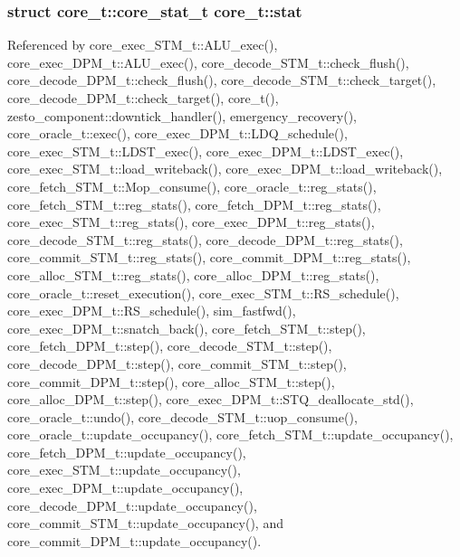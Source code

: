 \subsubsection[{stat}]{\setlength{\rightskip}{0pt plus 5cm}struct {\bf core\_\-t::core\_\-stat\_\-t}  {\bf core\_\-t::stat}}\label{classcore__t_fd66018e0e0529be576f673452a032df}




Referenced by core\_\-exec\_\-STM\_\-t::ALU\_\-exec(), core\_\-exec\_\-DPM\_\-t::ALU\_\-exec(), core\_\-decode\_\-STM\_\-t::check\_\-flush(), core\_\-decode\_\-DPM\_\-t::check\_\-flush(), core\_\-decode\_\-STM\_\-t::check\_\-target(), core\_\-decode\_\-DPM\_\-t::check\_\-target(), core\_\-t(), zesto\_\-component::downtick\_\-handler(), emergency\_\-recovery(), core\_\-oracle\_\-t::exec(), core\_\-exec\_\-DPM\_\-t::LDQ\_\-schedule(), core\_\-exec\_\-STM\_\-t::LDST\_\-exec(), core\_\-exec\_\-DPM\_\-t::LDST\_\-exec(), core\_\-exec\_\-STM\_\-t::load\_\-writeback(), core\_\-exec\_\-DPM\_\-t::load\_\-writeback(), core\_\-fetch\_\-STM\_\-t::Mop\_\-consume(), core\_\-oracle\_\-t::reg\_\-stats(), core\_\-fetch\_\-STM\_\-t::reg\_\-stats(), core\_\-fetch\_\-DPM\_\-t::reg\_\-stats(), core\_\-exec\_\-STM\_\-t::reg\_\-stats(), core\_\-exec\_\-DPM\_\-t::reg\_\-stats(), core\_\-decode\_\-STM\_\-t::reg\_\-stats(), core\_\-decode\_\-DPM\_\-t::reg\_\-stats(), core\_\-commit\_\-STM\_\-t::reg\_\-stats(), core\_\-commit\_\-DPM\_\-t::reg\_\-stats(), core\_\-alloc\_\-STM\_\-t::reg\_\-stats(), core\_\-alloc\_\-DPM\_\-t::reg\_\-stats(), core\_\-oracle\_\-t::reset\_\-execution(), core\_\-exec\_\-STM\_\-t::RS\_\-schedule(), core\_\-exec\_\-DPM\_\-t::RS\_\-schedule(), sim\_\-fastfwd(), core\_\-exec\_\-DPM\_\-t::snatch\_\-back(), core\_\-fetch\_\-STM\_\-t::step(), core\_\-fetch\_\-DPM\_\-t::step(), core\_\-decode\_\-STM\_\-t::step(), core\_\-decode\_\-DPM\_\-t::step(), core\_\-commit\_\-STM\_\-t::step(), core\_\-commit\_\-DPM\_\-t::step(), core\_\-alloc\_\-STM\_\-t::step(), core\_\-alloc\_\-DPM\_\-t::step(), core\_\-exec\_\-DPM\_\-t::STQ\_\-deallocate\_\-std(), core\_\-oracle\_\-t::undo(), core\_\-decode\_\-STM\_\-t::uop\_\-consume(), core\_\-oracle\_\-t::update\_\-occupancy(), core\_\-fetch\_\-STM\_\-t::update\_\-occupancy(), core\_\-fetch\_\-DPM\_\-t::update\_\-occupancy(), core\_\-exec\_\-STM\_\-t::update\_\-occupancy(), core\_\-exec\_\-DPM\_\-t::update\_\-occupancy(), core\_\-decode\_\-DPM\_\-t::update\_\-occupancy(), core\_\-commit\_\-STM\_\-t::update\_\-occupancy(), and core\_\-commit\_\-DPM\_\-t::update\_\-occupancy().
